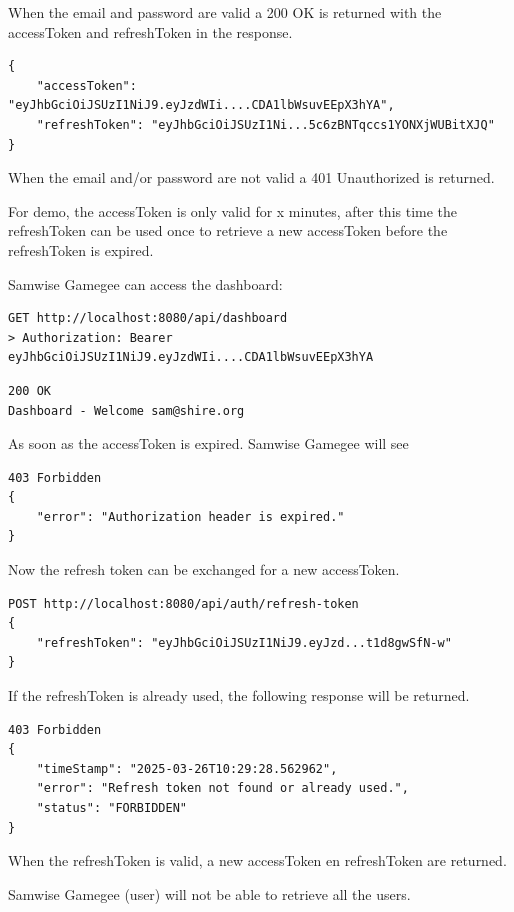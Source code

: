 When the email and password are valid a 200 OK is returned with the accessToken and refreshToken in the response.
\begin{verbatim}
{
	"accessToken": "eyJhbGciOiJSUzI1NiJ9.eyJzdWIi....CDA1lbWsuvEEpX3hYA",
	"refreshToken": "eyJhbGciOiJSUzI1Ni...5c6zBNTqccs1YONXjWUBitXJQ"
}
\end{verbatim}

When the email and/or password are not valid a 401 Unauthorized is returned.

For demo, the accessToken is only valid for x minutes,  after this time the refreshToken can be used once to retrieve a new accessToken before the refreshToken is expired.

Samwise Gamegee can access the dashboard:

\begin{verbatim}
GET http://localhost:8080/api/dashboard
> Authorization: Bearer eyJhbGciOiJSUzI1NiJ9.eyJzdWIi....CDA1lbWsuvEEpX3hYA
\end{verbatim}

\begin{verbatim}
200 OK
Dashboard - Welcome sam@shire.org
\end{verbatim}

As soon as the accessToken is expired. Samwise Gamegee will see

\begin{verbatim}
403 Forbidden
{
	"error": "Authorization header is expired."
}
\end{verbatim}

Now the refresh token can be exchanged for a new accessToken. 

\begin{verbatim}
POST http://localhost:8080/api/auth/refresh-token
{
	"refreshToken": "eyJhbGciOiJSUzI1NiJ9.eyJzd...t1d8gwSfN-w"
}
\end{verbatim}

If the refreshToken is already used, the following response will be returned.

\begin{verbatim}
403 Forbidden
{
	"timeStamp": "2025-03-26T10:29:28.562962",
	"error": "Refresh token not found or already used.",
	"status": "FORBIDDEN"
}
\end{verbatim}

When the refreshToken is valid, a new accessToken en refreshToken are returned.


Samwise Gamegee (user) will not be able to retrieve all the users.


